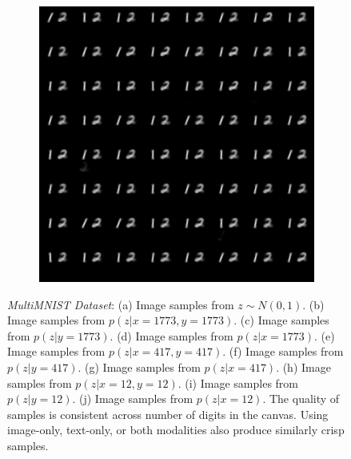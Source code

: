 \documentclass{article}
\begin{document}
\begin{figure}[!h]
\begin{subfigure}[b]{.24\linewidth}
        \caption{}
    \end{subfigure}
    \begin{subfigure}[b]{.24\linewidth}
        \centering
        \includegraphics[width=\linewidth]{multimnist_mmvae_condition_on_image_12_image_sample.png}
        \caption{}
    \end{subfigure}

    \caption{\emph{MultiMNIST Dataset}: (a) Image samples from $z \sim N(0, 1)$. (b) Image samples from $p(z|x=1773,y=1773)$. (c) Image samples from $p(z|y=1773)$. (d) Image samples from $p(z|x=1773)$. (e) Image samples from $p(z|x=417,y=417)$. (f) Image samples from $p(z|y=417)$. (g) Image samples from $p(z|x=417)$. (h) Image samples from $p(z|x=12,y=12)$. (i) Image samples from $p(z|y=12)$. (j) Image samples from $p(z|x=12)$. The quality of samples is consistent across number of digits in the canvas. Using image-only, text-only, or both modalities also produce similarly crisp samples.}
    \label{fig:multimnist:samples}
\end{figure}
\end{document}
